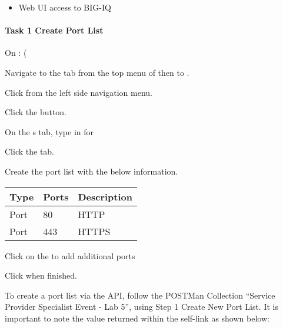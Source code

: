 \documentclass[letterpaper,10pt,english]{sphinxmanual}
\begin{document}
\begin{itemize}
\item {} 
Web UI access to BIG-IQ

\end{itemize}


\paragraph{Task 1 \textendash{} Create Port List}
\label{\detokenize{class1/module5/lab1:task-1-create-port-list}}
On : (

Navigate to the  tab from the top menu of 
then to .


Click  from the left side navigation menu.

Click the  button.

On the s tab, type in  for 

Click the  tab.

Create the port list with the below information.


\begin{savenotes}\sphinxattablestart
\centering
\begin{tabulary}{\linewidth}[t]{|T|T|T|}
\hline

Type
&
Ports
&
Description
\\
\hline
Port
&
80
&
HTTP
\\
\hline
Port
&
443
&
HTTPS
\\
\hline
\end{tabulary}
\par
\sphinxattableend\end{savenotes}

Click on the \sphinxstylestrong{+} to add additional ports


Click  when finished.

To create a port list via the API, follow the POSTMan Collection
“Service Provider Specialist Event - Lab 5”, using Step 1 \textendash{} Create New
Port List. It is important to note the value returned within the
self-link as shown below:
\end{document}
